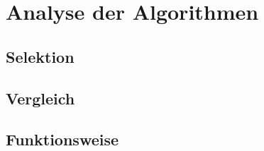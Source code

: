 \chapter{Analyse der Algorithmen}
\label{analyse}

\section{Selektion}
{
}

\section{Vergleich}
{
}

\section{Funktionsweise}
